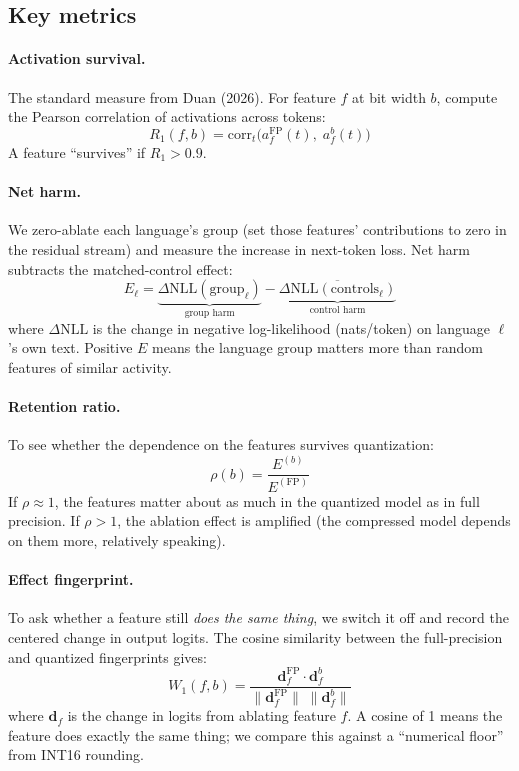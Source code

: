 \documentclass[11pt]{article}
\begin{document}
\subsection{Key metrics}

\paragraph{Activation survival.} The standard measure from Duan (2026). For feature $f$ at bit width $b$, compute the Pearson correlation of activations across tokens:
\begin{equation}
R_1(f, b) = \mathrm{corr}_t\!\big(a_f^{\mathrm{FP}}(t),\; a_f^{b}(t)\big)
\end{equation}
A feature ``survives'' if $R_1 > 0.9$.

\paragraph{Net harm.} We zero-ablate each language's group (set those features' contributions to zero in the residual stream) and measure the increase in next-token loss. Net harm subtracts the matched-control effect:
\begin{equation}
E_\ell = \underbrace{\Delta\mathrm{NLL}(\text{group}_\ell)}_{\text{group harm}} - \underbrace{\overline{\Delta\mathrm{NLL}(\text{controls}_\ell)}}_{\text{control harm}}
\end{equation}
where $\Delta\mathrm{NLL}$ is the change in negative log-likelihood (nats/token) on language $\ell$'s own text. Positive $E$ means the language group matters more than random features of similar activity.

\paragraph{Retention ratio.} To see whether the dependence on the features survives quantization:
\begin{equation}
\rho(b) = \frac{E^{(b)}}{E^{(\mathrm{FP})}}
\end{equation}
If $\rho \approx 1$, the features matter about as much in the quantized model as in full precision. If $\rho > 1$, the ablation effect is amplified (the compressed model depends on them more, relatively speaking).

\paragraph{Effect fingerprint.} To ask whether a feature still \textit{does the same thing}, we switch it off and record the centered change in output logits. The cosine similarity between the full-precision and quantized fingerprints gives:
\begin{equation}
W_1(f, b) = \frac{\mathbf{d}_f^{\mathrm{FP}} \cdot \mathbf{d}_f^{b}}{\|\mathbf{d}_f^{\mathrm{FP}}\|\;\|\mathbf{d}_f^{b}\|}
\end{equation}
where $\mathbf{d}_f$ is the change in logits from ablating feature $f$. A cosine of 1 means the feature does exactly the same thing; we compare this against a ``numerical floor'' from INT16 rounding.
\end{document}
